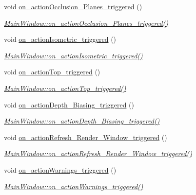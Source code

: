 \begin{DoxyCompactItemize}
void \hyperlink{class_main_window_a5276a8a1574c6344dbf4e2151caf0a08}{on\+\_\+action\+Occlusion\+\_\+\+Planes\+\_\+triggered} ()
\begin{DoxyCompactList}\small\item\em \hyperlink{class_main_window_a5276a8a1574c6344dbf4e2151caf0a08}{Main\+Window\+::on\+\_\+action\+Occlusion\+\_\+\+Planes\+\_\+triggered()} \end{DoxyCompactList}\item 
void \hyperlink{class_main_window_a9a1c4d7a462288215d815f7b6c87f7c1}{on\+\_\+action\+Isometric\+\_\+triggered} ()
\begin{DoxyCompactList}\small\item\em \hyperlink{class_main_window_a9a1c4d7a462288215d815f7b6c87f7c1}{Main\+Window\+::on\+\_\+action\+Isometric\+\_\+triggered()} \end{DoxyCompactList}\item 
void \hyperlink{class_main_window_a12c196357f488415909efd293a2bf6d0}{on\+\_\+action\+Top\+\_\+triggered} ()
\begin{DoxyCompactList}\small\item\em \hyperlink{class_main_window_a12c196357f488415909efd293a2bf6d0}{Main\+Window\+::on\+\_\+action\+Top\+\_\+triggered()} \end{DoxyCompactList}\item 
void \hyperlink{class_main_window_a85f9b158b4cf913593135ac5b3321b81}{on\+\_\+action\+Depth\+\_\+\+Biasing\+\_\+triggered} ()
\begin{DoxyCompactList}\small\item\em \hyperlink{class_main_window_a85f9b158b4cf913593135ac5b3321b81}{Main\+Window\+::on\+\_\+action\+Depth\+\_\+\+Biasing\+\_\+triggered()} \end{DoxyCompactList}\item 
void \hyperlink{class_main_window_a52c7776d665150af7b2393ab3e72b8d6}{on\+\_\+action\+Refresh\+\_\+\+Render\+\_\+\+Window\+\_\+triggered} ()
\begin{DoxyCompactList}\small\item\em \hyperlink{class_main_window_a52c7776d665150af7b2393ab3e72b8d6}{Main\+Window\+::on\+\_\+action\+Refresh\+\_\+\+Render\+\_\+\+Window\+\_\+triggered()} \end{DoxyCompactList}\item 
void \hyperlink{class_main_window_a018b6c693a863ad693ae5c5711e7e9a0}{on\+\_\+action\+Warnings\+\_\+triggered} ()
\begin{DoxyCompactList}\small\item\em \hyperlink{class_main_window_a018b6c693a863ad693ae5c5711e7e9a0}{Main\+Window\+::on\+\_\+action\+Warnings\+\_\+triggered()} \end{DoxyCompactList}\item 

\end{DoxyCompactItemize}
